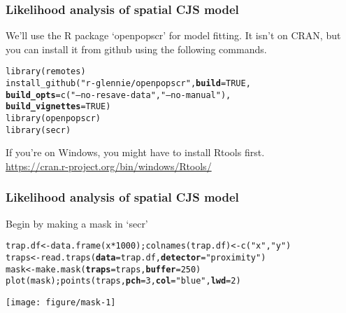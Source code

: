 \documentclass[color=usenames,dvipsnames]{beamer}\usepackage[]{graphicx}\usepackage[]{color}
\makeatletter
\newcommand{\hlnum}[1]{\textcolor[rgb]{0.69,0.494,0}{#1}}%
\newcommand{\hlstr}[1]{\textcolor[rgb]{0.749,0.012,0.012}{#1}}%
\newcommand{\hlopt}[1]{\textcolor[rgb]{0,0,0}{#1}}%
\newcommand{\hlstd}[1]{\textcolor[rgb]{0,0,0}{#1}}%
\newcommand{\hlkwb}[1]{\textcolor[rgb]{0,0.341,0.682}{#1}}%
\newcommand{\hlkwc}[1]{\textcolor[rgb]{0,0,0}{\textbf{#1}}}%
\newcommand{\hlkwd}[1]{\textcolor[rgb]{0.004,0.004,0.506}{#1}}%
\newenvironment{kframe}{%
 \def\at@end@of@kframe{}%
 \ifinner\ifhmode%
  \def\at@end@of@kframe{\end{minipage}}%
  \begin{minipage}{\columnwidth}%
 \fi\fi%
 \def\FrameCommand##1{\hskip\@totalleftmargin \hskip-\fboxsep
 \colorbox{shadecolor}{##1}\hskip-\fboxsep
     \hskip-\linewidth \hskip-\@totalleftmargin \hskip\columnwidth}%
 \MakeFramed {\advance\hsize-\width
   \@totalleftmargin\z@ \linewidth\hsize
   \@setminipage}}%
 {\par\unskip\endMakeFramed%
 \at@end@of@kframe}
\newenvironment{knitrout}{}{} %
\makeatother
\begin{document}
\begin{frame}[fragile]
  \frametitle{Likelihood analysis of spatial CJS model}
  We'll use the R package `openpopscr' for model fitting. It isn't on
  CRAN, but you can install it from github using the following
  commands.
\begin{knitrout}\scriptsize
{}\color{fgcolor}\begin{kframe}
\begin{alltt}
\hlkwd{library}\hlstd{(remotes)}
\hlkwd{install_github}\hlstd{(}\hlstr{"r-glennie/openpopscr"}\hlstd{,} \hlkwc{build} \hlstd{=} \hlnum{TRUE}\hlstd{,}
               \hlkwc{build_opts} \hlstd{=} \hlkwd{c}\hlstd{(}\hlstr{"--no-resave-data"}\hlstd{,} \hlstr{"--no-manual"}\hlstd{),}
               \hlkwc{build_vignettes} \hlstd{=} \hlnum{TRUE}\hlstd{)}
\hlkwd{library}\hlstd{(openpopscr)}
\hlkwd{library}\hlstd{(secr)}
\end{alltt}
\end{kframe}
\end{knitrout}
\vfill
If you're on Windows, you might have to install Rtools first. \\
\centering
\url{https://cran.r-project.org/bin/windows/Rtools/} \\

\end{frame}



\begin{frame}[fragile]
  \frametitle{Likelihood analysis of spatial CJS model}
Begin by making a mask in `secr'
\begin{knitrout}\scriptsize
{}\color{fgcolor}\begin{kframe}
\begin{alltt}
\hlstd{trap.df} \hlkwb{<-} \hlkwd{data.frame}\hlstd{(x}\hlopt{*}\hlnum{1000}\hlstd{);} \hlkwd{colnames}\hlstd{(trap.df)} \hlkwb{<-} \hlkwd{c}\hlstd{(}\hlstr{"x"}\hlstd{,}\hlstr{"y"}\hlstd{)}
\hlstd{traps} \hlkwb{<-} \hlkwd{read.traps}\hlstd{(}\hlkwc{data}\hlstd{=trap.df,} \hlkwc{detector}\hlstd{=}\hlstr{"proximity"}\hlstd{)}
\hlstd{mask} \hlkwb{<-} \hlkwd{make.mask}\hlstd{(}\hlkwc{traps}\hlstd{=traps,} \hlkwc{buffer}\hlstd{=}\hlnum{250}\hlstd{)}
\hlkwd{plot}\hlstd{(mask);} \hlkwd{points}\hlstd{(traps,} \hlkwc{pch}\hlstd{=}\hlnum{3}\hlstd{,} \hlkwc{col}\hlstd{=}\hlstr{"blue"}\hlstd{,} \hlkwc{lwd}\hlstd{=}\hlnum{2}\hlstd{)}
\end{alltt}
\end{kframe}

{\centering \texttt{[image: figure/mask-1]} 

}


\end{knitrout}
\end{frame}
\end{document}
